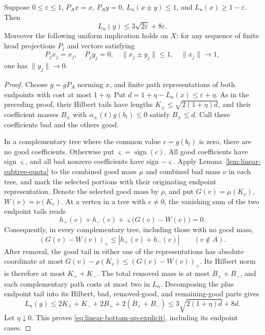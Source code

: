 \begin{theorem}
\label{thm:linear-bottom-up-tail}
Suppose \(0\le\varepsilon\le1\), \(P_Ax=x\), \(P_Ay=0\),
\(L_n(x\pm y)\le1\), and \(L_n(x)\ge1-\varepsilon\). Then
\begin{equation}\label{eq:linear-bottom-up-explicit}
 L_n(y)\le3\sqrt{2\varepsilon}+8\varepsilon.
\end{equation}
Moreover the following uniform implication holds on \(X\): for any
sequence of finite head projections \(P_j\) and vectors satisfying
\[
 P_jx_j=x_j,\quad P_jy_j=0,\quad
 \|x_j\pm y_j\|\le1,\quad\|x_j\|\longrightarrow1,
\]
one has \(\|y_j\|\longrightarrow0\).
\end{theorem}
\begin{proof}
Choose \(g=gP_A\) norming \(x\), and finite path representations of
both endpoints with cost at most \(1+\eta\). Put
\(d=1+\eta-L_n(x)\le\varepsilon+\eta\). As in the preceding proof,
their Hilbert tails have lengths \(K_\pm\le\sqrt{2(1+\eta)d}\), and
their coefficient masses \(B_\pm\) with
\(\alpha_\pm(t)g(b_t)\le0\) satisfy \(B_\pm\le d\). Call these
coefficients bad and the others good.

In a complementary tree where the common value \(c=g(b_t)\) is zero,
there are no good coefficients. Otherwise put \(\varsigma=\operatorname{sign}(c)\).
All good coefficients have sign \(\varsigma\), and all bad nonzero
coefficients have sign \(-\varsigma\). Apply
Lemma~\ref{lem:linear-subtree-quota} to the combined good mass \(\mu\)
and combined bad mass \(\nu\) in each tree, and mark the selected
portions with their originating endpoint representation. Denote the
selected good mass by \(\rho\), and put
\(G(v)=\mu(K_v)\), \(W(v)=\nu(K_v)\). At a vertex in a tree with \(c\ne0\),
the vanishing sum of the two endpoint tails reads
\[
 h_+(v)+h_-(v)+\varsigma\bigl(G(v)-W(v)\bigr)=0.
\]
Consequently, in every complementary tree, including those with no good mass,
\[
 (G(v)-W(v))_+\le|h_+(v)+h_-(v)|\qquad(v\notin A).
\]
After removal, the good tail in either one of the representations has
absolute coordinate at most \(G(v)-\rho(K_v)\le(G(v)-W(v))_+\).
Its Hilbert norm is therefore at most \(K_++K_-\). The total removed
mass is at most \(B_++B_-\), and each complementary path costs at most
two in \(L_n\). Decomposing the plus endpoint tail into its Hilbert,
bad, removed-good, and remaining-good parts gives
\[
 L_n(y)\le2K_++K_-+2B_++2(B_++B_-)
 \le3\sqrt{2(1+\eta)d}+8d.
\]
Let \(\eta\downarrow0\). This proves
\eqref{eq:linear-bottom-up-explicit}, including its endpoint cases.


\end{proof}
